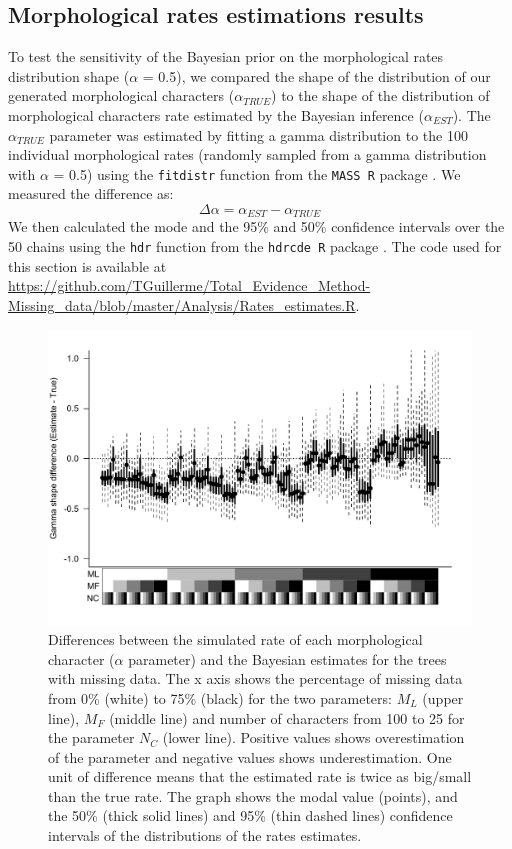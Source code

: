 \documentclass[12pt,letterpaper]{article}
\begin{document}
\subsection{Morphological rates estimations results}
To test the sensitivity of the Bayesian prior on the morphological rates distribution shape ($\alpha$ = 0.5), we compared the shape of the distribution of our generated morphological characters ($\alpha_{TRUE}$) to the shape of the distribution of morphological characters rate estimated by the Bayesian inference ($\alpha_{EST}$).
The $\alpha_{TRUE}$ parameter was estimated by fitting a gamma distribution to the 100 individual morphological rates (randomly sampled from a gamma distribution with $\alpha$ = 0.5) using the \texttt{fitdistr} function from the \texttt{MASS R} package \citep{MASS}.
We measured the difference as:
\begin{equation}
\Delta\alpha=\alpha_{EST} - \alpha_{TRUE}
\end{equation}
We then calculated the mode and the 95\% and 50\% confidence intervals over the 50 chains using the \texttt{hdr} function from the \texttt{hdrcde R} package \citep{hdrcde}.
The code used for this section is available at \url{https://github.com/TGuillerme/Total_Evidence_Method-Missing_data/blob/master/Analysis/Rates_estimates.R}.

\begin{figure}
\centering
\includegraphics[width=\textwidth,keepaspectratio]{SupplementaryFigures/Rates_estimates.pdf}
\caption{Differences between the simulated rate of each morphological character ($\alpha$ parameter) and the Bayesian estimates for the trees with missing data. The x axis shows the percentage of missing data from 0\% (white) to 75\% (black) for the two parameters: $M_{L}$ (upper line), $M_{F}$ (middle line) and number of characters from 100 to 25 for the parameter $N_{C}$ (lower line). Positive values shows overestimation of the parameter and negative values shows underestimation. One unit of difference means that the estimated rate is twice as big/small than the true rate. The graph shows the modal value (points), and the 50\% (thick solid lines) and 95\% (thin dashed lines) confidence intervals of the distributions of the rates estimates.}
\label{Fig_AppendixRates}
\end{figure}
\end{document}
